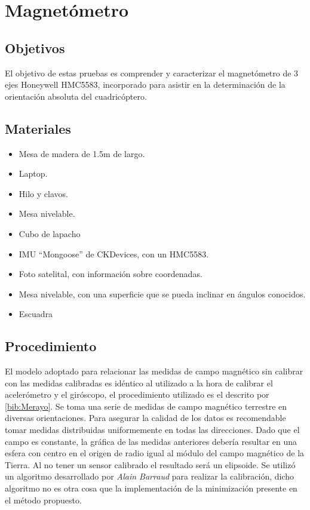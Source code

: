 \documentclass[spanish,12pt,a4paper,titlepage]{report}
\begin{document}
\chapter{Magnetómetro}
\label{chap:magnetometro}

\section{Objetivos}

El objetivo de estas pruebas es comprender y caracterizar el magnetómetro de 3 ejes Honeywell HMC5583, incorporado para asistir en la determinación de la orientación absoluta del cuadricóptero.

\section{Materiales}
\label{sec:materiales}

\begin{itemize}
\item Mesa de madera de 1.5m de largo.
\item Laptop.
\item Hilo y clavos.
\item Mesa nivelable.
\item Cubo de lapacho
\item IMU ``Mongoose'' de CKDevices, con un HMC5583.
\item Foto satelital, con información sobre coordenadas.
\item Mesa nivelable, con una superficie que se pueda inclinar en ángulos conocidos.
\item Escuadra
\end{itemize}

\newpage

\section{Procedimiento}
\label{sec:procedimiento}

El modelo adoptado para relacionar las medidas de campo magnético sin calibrar con las medidas calibradas es idéntico al utilizado a la hora de calibrar el acelerómetro y el giróscopo, el procedimiento utilizado es el descrito por \ref{bib:Merayo}. Se toma una serie de medidas de campo magnético terrestre en diversas orientaciones. Para asegurar la calidad de los datos es recomendable tomar medidas distribuidas uniformemente en todas las direcciones. Dado que el campo es constante, la gráfica de las medidas anteriores debería resultar en una esfera con centro en el origen de radio igual al módulo del campo magnético de la Tierra. Al no tener un sensor calibrado el resultado será un elipsoide. Se utilizó un algoritmo desarrollado por \emph{Alain Barraud} para realizar la calibración, dicho algoritmo no es otra cosa que la implementación de la minimización presente en el método propuesto.\\
\end{document}
